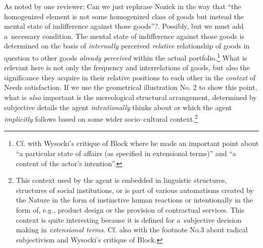 As noted by one reviewer: Can we just rephrase Nozick in the way that ``the homogenized element is not some homogenized class of goods but instead the mental state of indifference against those goods''?. Possibly, but we must add a~necessary condition. The mental state of indifference against those goods is determined on the basis of \textit{internally} perceived \textit{relative} relationship of goods in question to other goods \textit{already perceived} within the actual portfolio.\footnote{Cf. with Wysocki's 
\parencite*[][pp.26–27]{} %
 critique of Block where he made an important point about ``a particular state of affairs (as specified in extensional terms)'' and ``a content of the actor's intention''.} What is relevant here is not only the frequency and interrelations of goods, but also the significance they acquire in their relative positions to each other in the \textit{context} of Needs satisfaction. If we use the geometrical illustration No. 2 to show this point, what is \textit{also} important is the mereological structural arrangement, determined by subjective details the agent \textit{intentionally} thinks about or which the agent \textit{implicitly} follows based on some wider socio–cultural context.\footnote{This context used by the agent is embedded in linguistic structures, structures of social institutions, or is part of various automatisms created by the Nature in the form of instinctive human reactions or intentionally in the form of, e.g., product design or the provision of contractual services. This context is quite interesting because it is defined for a~subjective decision making in \textit{extensional terms}. Cf. also with the footnote No.3 about radical subjectivism and Wysocki's 
\parencite*[][pp.26–27]{} %
 critique of Block.}



